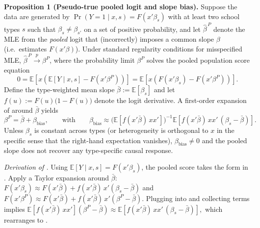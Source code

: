 \documentclass[12pt]{article}
\newcommand{\E}{\mathbb{E}}
\begin{document}
\vspace{0.5em}
\noindent\textbf{Proposition 1 (Pseudo-true pooled logit and slope bias).}
Suppose the data are generated by $\Pr(Y=1\mid x,s)=F(x'\beta_s)$ with at least two school types $s$ such that $\beta_s\neq \beta_{s'}$ on a set of positive probability, and let $\widehat\beta^{\,P}$ denote the MLE from the \emph{pooled} logit that (incorrectly) imposes a common slope $\beta$ (i.e.\ estimates $F(x'\beta)$). Under standard regularity conditions for misspecified MLE, $\widehat\beta^{\,P}\overset{p}{\to}\beta^{P}$, where the probability limit $\beta^{P}$ solves the pooled population score equation
\begin{equation}
\label{eq:pooled_score}
0
=
\E\!\left[
x\left(
\E[Y\mid x,s]-F(x'\beta^{P})
\right)
\right]
=
\E\!\left[
x\left(
F(x'\beta_{s})-F(x'\beta^{P})
\right)
\right].
\end{equation}
Define the type-weighted mean slope $\bar\beta:=\E[\beta_s]$ and let $f(u):=F(u)\big(1-F(u)\big)$ denote the logit derivative. A first-order expansion of  around $\bar\beta$ yields
\begin{equation}
\label{eq:beta_bias}
\beta^{P}
=
\bar\beta
+
\beta_{\mathrm{bias}},
\qquad\text{with}\qquad
\beta_{\mathrm{bias}}
\approx
\Big(\E\!\left[f(x'\bar\beta)\,x x'\right]\Big)^{-1}
\E\!\left[f(x'\bar\beta)\,x x'\,(\beta_{s}-\bar\beta)\right].
\end{equation}
Unless $\beta_s$ is constant across types (or heterogeneity is orthogonal to $x$ in the specific sense that the right-hand expectation vanishes), $\beta_{\mathrm{bias}}\neq 0$ and the pooled slope does not recover any type-specific causal response.

\vspace{0.5em}
\noindent\textit{Derivation of .}
Using $\E[Y\mid x,s]=F(x'\beta_s)$, the pooled score takes the form in . Apply a Taylor expansion around $\bar\beta$:
\(
F(x'\beta_s)\approx F(x'\bar\beta)+f(x'\bar\beta)\,x'(\beta_s-\bar\beta)
\)
and
\(
F(x'\beta^{P})\approx F(x'\bar\beta)+f(x'\bar\beta)\,x'(\beta^{P}-\bar\beta).
\)
Plugging into  and collecting terms implies
\(
\E\!\left[f(x'\bar\beta)\,x x'\right](\beta^{P}-\bar\beta)
\approx
\E\!\left[f(x'\bar\beta)\,x x'\,(\beta_s-\bar\beta)\right],
\)
which rearranges to .
\end{document}
